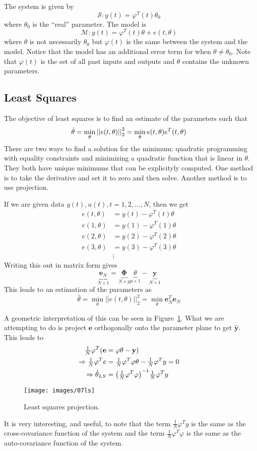 The system is given by
$$\mathcal{S}: y(t) = \varphi^T(t)\theta_0$$
where $\theta_0$ is the ``real'' parameter.
The model is
$$\mathcal{M}: y(t) = \varphi^T(t)\theta + e(t,\theta)$$
where $\theta$ is not necessarily $\theta_0$ but $\varphi(t)$ is the same between the system and the model.
Notice that the model has an additional error term for when $\theta\neq\theta_0$.
Note that $\varphi(t)$ is the set of all past inputs and outputs and $\theta$ contains the unknown parameters.

\subsection{Least Squares}
The objective of least squares is to find an estimate of the parameters such that
$$\hat{\theta} = \min_\theta\left|\left|e(t,\theta)\right|\right|_2^2 = \min_\theta e(t,\theta)e^T(t,\theta)$$
There are two ways to find a solution for the minimum: quadratic programming with equality constraints and minimizing a quadratic function that is linear in $\theta$.
They both have unique minimums that can be explicityly computed.
One method is to take the derivative and set it to zero and then solve.
Another method is to use projection.

If we are given data $y(t),u(t),t=1,2,\ldots,N$, then we get
\begin{align*}
e(t,\theta) &= y(t) - \varphi^T(t)\theta \\
e(1,\theta) &= y(1) - \varphi^T(1)\theta \\
e(2,\theta) &= y(2) - \varphi^T(2)\theta \\
e(3,\theta) &= y(3) - \varphi^T(3)\theta \\
&\vdots
\end{align*}
Writing this out in matrix form gives
$$\underbrace{\mathbf{e}_N}_{N\times 1} = \underbrace{\mathbf{\Phi}}_{N\times p}\underbrace{\theta}_{p\times 1} - \underbrace{\mathbf{y}}_{N\times 1}$$
This leads to an estimation of the parameters as
$$\hat{\theta} = \min_\theta ||e(t,\theta)||_2^2 = \min_\theta \mathbf{e}_N^T\mathbf{e}_N$$

A geometric interpretation of this can be seen in Figure~\ref{fig:07ls}.
What we are attempting to do is project $\mathbf{e}$ orthogonally onto the parameter plane to get $\hat{\mathbf{y}}$.
This leads to
\begin{align*}
\tfrac{1}{N}\varphi^T(\mathbf{e} &= \mathbf{\varphi}\mathbf{\theta} - \mathbf{y}) \\
\Rightarrow \tfrac{1}{N}\varphi^T e &= \tfrac{1}{N}\varphi^T\varphi\theta - \tfrac{1}{N}\varphi^T y = 0 \\
\Rightarrow \hat{\theta}_{LS} &= {\left(\tfrac{1}{N}\varphi^T \varphi\right)}^{-1} \tfrac{1}{N}\varphi^T y
\end{align*}

\begin{figure}[ht!]
\centering
\texttt{[image: images/07ls]}
\caption{Least squares projection.}
\label{fig:07ls}
\end{figure}

It is very interesting, and useful, to note that the term $\tfrac{1}{N}\varphi^T y$ is the same as the cross-covariance function of the system and the term $\tfrac{1}{N}\varphi^T\varphi$ is the same as the auto-covariance function of the system.
